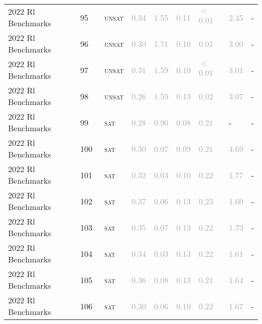 \begin{center}
{\begin{longtable}{@{}lllllllll@{}}
2022 Rl Benchmarks & 95 & ~\textsc{unsat} & \textcolor{darkgray}{0.34} & \textcolor{darkgray}{1.55} & \textcolor{darkgray}{0.11} & \textcolor{darkgray}{$<$0.01} & \textcolor{darkgray}{2.45} & - \\
2022 Rl Benchmarks & 96 & ~\textsc{unsat} & \textcolor{darkgray}{0.30} & \textcolor{darkgray}{1.71} & \textcolor{darkgray}{0.10} & \textcolor{darkgray}{0.01} & \textcolor{darkgray}{3.00} & - \\
2022 Rl Benchmarks & 97 & ~\textsc{unsat} & \textcolor{darkgray}{0.31} & \textcolor{darkgray}{1.59} & \textcolor{darkgray}{0.10} & \textcolor{darkgray}{$<$0.01} & \textcolor{darkgray}{3.01} & - \\
2022 Rl Benchmarks & 98 & ~\textsc{unsat} & \textcolor{darkgray}{0.26} & \textcolor{darkgray}{1.59} & \textcolor{darkgray}{0.13} & \textcolor{darkgray}{0.02} & \textcolor{darkgray}{3.07} & - \\
2022 Rl Benchmarks & 99 & ~\textsc{sat} & \textcolor{darkgray}{0.28} & \textcolor{darkgray}{0.90} & \textcolor{darkgray}{0.08} & \textcolor{darkgray}{0.21} & - & - \\
2022 Rl Benchmarks & 100 & ~\textsc{sat} & \textcolor{darkgray}{0.30} & \textcolor{darkgray}{0.07} & \textcolor{darkgray}{0.09} & \textcolor{darkgray}{0.21} & \textcolor{darkgray}{4.69} & - \\
2022 Rl Benchmarks & 101 & ~\textsc{sat} & \textcolor{darkgray}{0.32} & \textcolor{darkgray}{0.03} & \textcolor{darkgray}{0.10} & \textcolor{darkgray}{0.22} & \textcolor{darkgray}{1.77} & - \\
2022 Rl Benchmarks & 102 & ~\textsc{sat} & \textcolor{darkgray}{0.37} & \textcolor{darkgray}{0.06} & \textcolor{darkgray}{0.13} & \textcolor{darkgray}{0.23} & \textcolor{darkgray}{1.60} & - \\
2022 Rl Benchmarks & 103 & ~\textsc{sat} & \textcolor{darkgray}{0.35} & \textcolor{darkgray}{0.07} & \textcolor{darkgray}{0.13} & \textcolor{darkgray}{0.22} & \textcolor{darkgray}{1.73} & - \\
2022 Rl Benchmarks & 104 & ~\textsc{sat} & \textcolor{darkgray}{0.34} & \textcolor{darkgray}{0.03} & \textcolor{darkgray}{0.13} & \textcolor{darkgray}{0.22} & \textcolor{darkgray}{1.61} & - \\
2022 Rl Benchmarks & 105 & ~\textsc{sat} & \textcolor{darkgray}{0.36} & \textcolor{darkgray}{0.08} & \textcolor{darkgray}{0.13} & \textcolor{darkgray}{0.21} & \textcolor{darkgray}{1.64} & - \\
2022 Rl Benchmarks & 106 & ~\textsc{sat} & \textcolor{darkgray}{0.30} & \textcolor{darkgray}{0.06} & \textcolor{darkgray}{0.10} & \textcolor{darkgray}{0.22} & \textcolor{darkgray}{1.67} & - \\

\end{longtable}}
\end{center}
